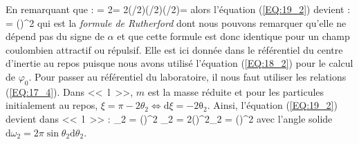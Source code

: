 \eea
En remarquant que :
\be
	\omega = 2\pi\sin\xi{}\xi = 2\pi{}\cos(\xi/2)\sin(\xi/2)\xi \Leftrightarrow \pi\cos(\xi/2)\xi = 
\ee
alors l'\'equation (\ref{EQ:19_2}) devient :
\be
	\sigma = \left(\right)^{2} \label{EQ:19_3}
\ee
qui est la \emph{formule de Rutherford} dont nous pouvons remarquer qu'elle ne d\'epend pas du signe de $\alpha$ et que cette formule est donc identique pour un champ coulombien attractif ou r\'epulsif. Elle est ici donn\'ee dans le r\'ef\'erentiel du centre d'inertie au repos puisque nous avons utilis\'e l'\'equation (\ref{EQ:18_2}) pour le calcul de $\varphi_{0}$. Pour passer au r\'ef\'erentiel du laboratoire, il nous faut utiliser les relations (\ref{EQ:17_4}). Dans <<~l~>>, $m$ est la masse r\'eduite et pour les particules initialement au repos, $\xi = \pi - 2\theta_{2} \Leftrightarrow \mathrm{d}\xi = -2\mathrm{\theta_{2}}$. Ainsi, l'\'equation (\ref{EQ:19_2}) devient dans <<~l~>> :
\be
	\sigma_{2} = \Bigg{}\pi\left(\right)^{2} \Bigg\rvert {}\theta_{2} = 2\pi\left(\right)^{2}\theta_{2} = \left(\right)^{2} \label{EQ:19_4}
\ee
avec l'angle solide $\mathrm{d}\omega_{2} = 2\pi\sin\theta_{2}\mathrm{d}\theta_{2}$.

